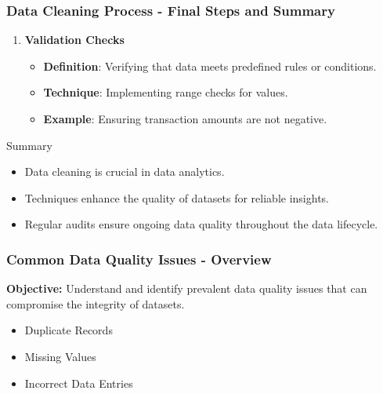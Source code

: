 \documentclass[aspectratio=169]{beamer}
\begin{document}
\begin{frame}[fragile]
    \frametitle{Data Cleaning Process - Final Steps and Summary}
    \begin{enumerate}[resume]
        \item \textbf{Validation Checks}
            \begin{itemize}
                \item \textbf{Definition}: Verifying that data meets predefined rules or conditions.
                \item \textbf{Technique}: Implementing range checks for values.
                \item \textbf{Example}: Ensuring transaction amounts are not negative.
            \end{itemize}

    \end{enumerate}

    \begin{block}{Summary}
        \begin{itemize}
            \item Data cleaning is crucial in data analytics.
            \item Techniques enhance the quality of datasets for reliable insights.
            \item Regular audits ensure ongoing data quality throughout the data lifecycle.
        \end{itemize}
    \end{block}
\end{frame}

\begin{frame}[fragile]
    \frametitle{Common Data Quality Issues - Overview}
    \textbf{Objective:} Understand and identify prevalent data quality issues that can compromise the integrity of datasets.
    
    \begin{itemize}
        \item Duplicate Records
        \item Missing Values
        \item Incorrect Data Entries
    \end{itemize}
\end{frame}
\end{document}

